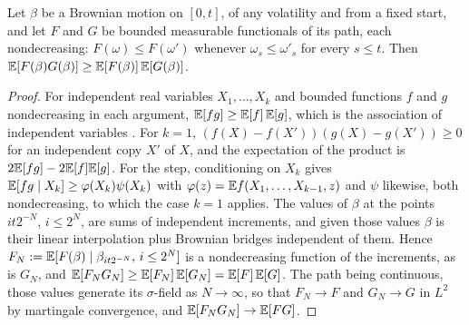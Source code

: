 
\begin{lemma}\label{lem:assoc}
Let $\beta$ be a Brownian motion on $[0,t]$, of any volatility and from a
fixed start, and let $F$ and $G$ be bounded measurable functionals of its
path, each nondecreasing: $F(\omega)\le F(\omega')$ whenever
$\omega_s\le\omega'_s$ for every $s\le t$. Then
$\mathbb{E}[F(\beta)G(\beta)]\ge\mathbb{E}[F(\beta)]\,\mathbb{E}[G(\beta)]$.
\end{lemma}

\begin{proof}
For independent real variables $X_1,\dots,X_k$ and bounded functions $f$
and $g$ nondecreasing in each argument, $\mathbb{E}[fg]\ge\mathbb{E}[f]\,\mathbb{E}[g]$, which is
the association of independent variables \cite{EPW67}. For $k=1$,
$(f(X)-f(X'))(g(X)-g(X'))\ge0$ for an independent copy $X'$ of $X$, and
the expectation of the product is $2\mathbb{E}[fg]-2\mathbb{E}[f]\mathbb{E}[g]$. For the step,
conditioning on $X_k$ gives $\mathbb{E}[fg\mid X_k]\ge\varphi(X_k)\psi(X_k)$ with
$\varphi(z)=\mathbb{E} f(X_1,\dots,X_{k-1},z)$ and $\psi$ likewise, both
nondecreasing, to which the case $k=1$ applies. The values of $\beta$ at
the points $it2^{-N}$, $i\le2^N$, are sums of independent increments, and
given those values $\beta$ is their linear interpolation plus Brownian
bridges independent of them. Hence
$F_N:=\mathbb{E}[F(\beta)\mid\beta_{it2^{-N}},\,i\le2^N]$ is a nondecreasing
function of the increments, as is $G_N$, and
$\mathbb{E}[F_NG_N]\ge\mathbb{E}[F_N]\,\mathbb{E}[G_N]=\mathbb{E}[F]\,\mathbb{E}[G]$. The path being continuous,
those values generate its $\sigma$-field as $N\to\infty$, so that
$F_N\to F$ and $G_N\to G$ in $L^2$ by martingale convergence, and
$\mathbb{E}[F_NG_N]\to\mathbb{E}[FG]$.
\end{proof}


